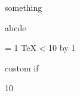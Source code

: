 
\if something \fi


 a\or b\or c\or d\else e\fi


 = 1
\loop
  \TeX
\ifnum{} < 10
\advance{} by 1
\repeat


\if@director
 custom if
\else
\fi

\relax




 10

\counting

\newdimen\mydimen

\newcount { \mycounter }

